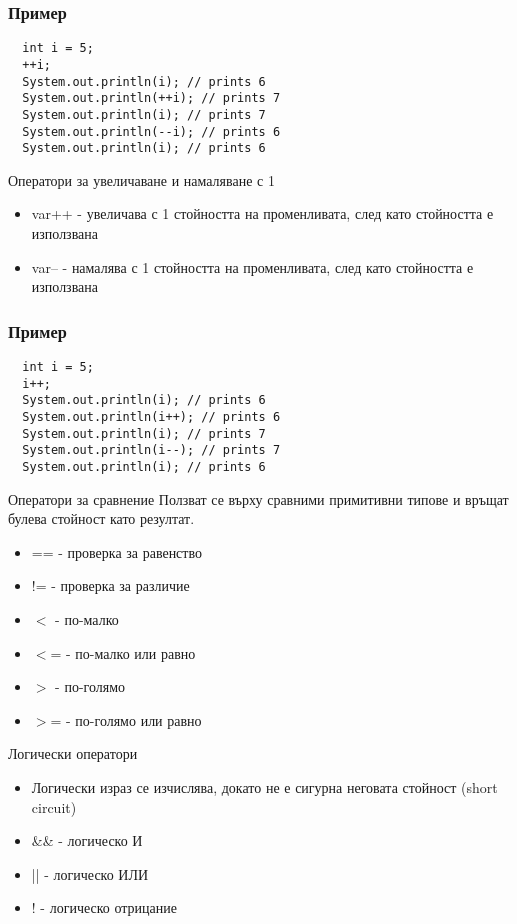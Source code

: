 \documentclass{beamer}
\begin{document}
\begin{frame}[fragile]
  \frametitle{Пример}
  \transdissolve
\begin{lstlisting}
  int i = 5;
  ++i;
  System.out.println(i); // prints 6
  System.out.println(++i); // prints 7
  System.out.println(i); // prints 7
  System.out.println(--i); // prints 6
  System.out.println(i); // prints 6
\end{lstlisting}
\end{frame}


\begin{frame}{Оператори за увеличаване и намаляване с 1}
  \transdissolve
  \begin{itemize}
  \item var++ - увеличава с 1 стойността на
    променливата, след като стойността е
    използвана
  \item var-- - намалява с 1 стойността на
    променливата, след като стойността е
    използвана
  \end{itemize}
\end{frame}

\begin{frame}[fragile]
  \frametitle{Пример}
  \transdissolve
\begin{lstlisting}
  int i = 5;
  i++;
  System.out.println(i); // prints 6
  System.out.println(i++); // prints 6
  System.out.println(i); // prints 7
  System.out.println(i--); // prints 7
  System.out.println(i); // prints 6
\end{lstlisting}
\end{frame}


\begin{frame}{Оператори за сравнение}
  \transdissolve
  Ползват се върху сравними примитивни
  типове и връщат булева стойност като резултат.
  
  \begin{itemize}
  \item == - проверка за равенство
  \item != - проверка за различие
  \item $<$  - по-малко
  \item $<$= - по-малко или равно
  \item $>$  - по-голямо
  \item $>$= - по-голямо или равно
  \end{itemize}

\end{frame}

\begin{frame}{Логически оператори}
  \transdissolve
  \begin{itemize}
  \item   Логически израз се изчислява, докато
    не е сигурна неговата стойност (short
    circuit)
  \item \&\& - логическо И
  \item || - логическо ИЛИ
  \item ! - логическо отрицание

  \end{itemize}
\end{frame}
\end{document}
